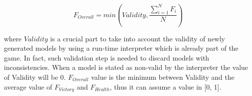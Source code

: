 \begin{equation}
	F_{Overall} = min \left (Validity, \frac{\sum\limits_{i=1}^{N}F_{i}}{N} \right )
\end{equation}

\noindent where $Validity$ is a crucial part to take into account the validity of  newly generated models by using a run-time interpreter which is already part of the game. In fact, such validation step is needed to discard models with inconsistencies. When a model is stated as non-valid by the interpreter the value of Validity will be 0.  $F_{Overall}$ value is the minimum between Validity and the average value of $F_{Victory}$ and $F_{Health}$, thus it can assume a value in [0, 1].





